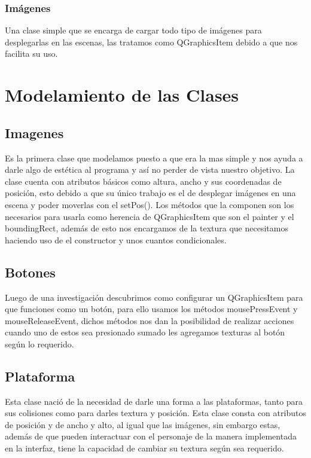 \documentclass{article}
\begin{document}
            \subsubsection{Imágenes}
            Una clase simple que se encarga de cargar todo tipo de imágenes para desplegarlas en las escenas, las tratamos como QGraphicsItem debido a que nos facilita su uso.
    
\section{Modelamiento de las Clases}
    \subsection{Imagenes}
    Es la primera clase que modelamos puesto a que era la mas simple y nos ayuda a darle algo de estética al programa y así no perder de vista nuestro objetivo. La clase cuenta con atributos básicos como altura, ancho y sus coordenadas de posición, esto debido a que su único trabajo es el de desplegar imágenes en una escena y poder moverlas con el setPos(). Los métodos que la componen son los necesarios para usarla como herencia de QGraphicsItem que son el painter y el boundingRect, además de esto nos encargamos de la textura que necesitamos haciendo uso de el constructor y unos cuantos condicionales.
    
    \subsection{Botones}
    Luego de una investigación descubrimos como configurar un QGraphicsItem para que funciones como un botón, para ello usamos los métodos mousePressEvent y mouseReleaseEvent, dichos métodos nos dan la posibilidad de realizar acciones cuando uno de estos sea presionado sumado les agregamos texturas al botón según lo requerido. 
    
    \subsection{Plataforma}
    Esta clase nació de la necesidad de darle una forma a las plataformas, tanto para sus colisiones como para darles textura y posición. Esta clase consta con atributos de posición y de ancho y alto, al igual que las imágenes, sin embargo estas, además de que pueden interactuar con el personaje de la manera implementada en la interfaz, tiene la capacidad de cambiar su textura según sea requerido.
    
\end{document}

